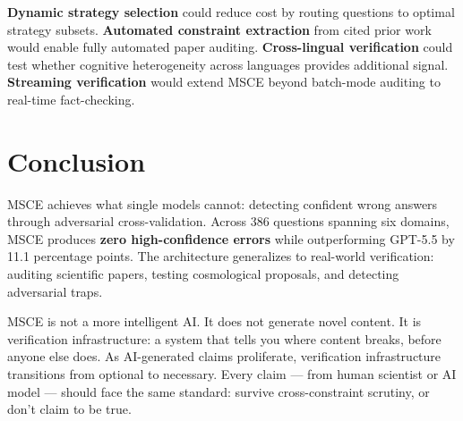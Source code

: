 \documentclass[11pt,a4paper]{article}
\begin{document}
\textbf{Dynamic strategy selection} could reduce cost by routing questions to optimal strategy subsets. \textbf{Automated constraint extraction} from cited prior work would enable fully automated paper auditing. \textbf{Cross-lingual verification} could test whether cognitive heterogeneity across languages provides additional signal. \textbf{Streaming verification} would extend MSCE beyond batch-mode auditing to real-time fact-checking.

\section{Conclusion}

MSCE achieves what single models cannot: detecting confident wrong answers through adversarial cross-validation. Across 386 questions spanning six domains, MSCE produces \textbf{zero high-confidence errors} while outperforming GPT-5.5 by 11.1 percentage points. The architecture generalizes to real-world verification: auditing scientific papers, testing cosmological proposals, and detecting adversarial traps.

MSCE is not a more intelligent AI. It does not generate novel content. It is verification infrastructure: a system that tells you where content breaks, before anyone else does. As AI-generated claims proliferate, verification infrastructure transitions from optional to necessary. Every claim — from human scientist or AI model — should face the same standard: survive cross-constraint scrutiny, or don't claim to be true.
\end{document}
